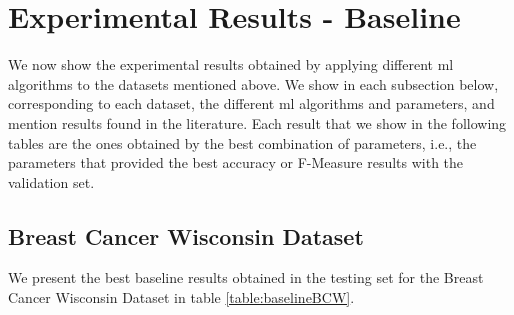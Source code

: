 \section{Experimental Results - Baseline}
\label{sec:ExperimentalResultsBaseline}


We now show the experimental results obtained by applying different \ac{ml} algorithms to the datasets mentioned above. We show in each subsection below, corresponding to each dataset, the different \ac{ml} algorithms and parameters, and mention results found in the literature. Each result that we show in the following tables are the ones obtained by the best combination of parameters, i.e., the parameters that provided the best accuracy or F-Measure results with the validation set.

\subsection{Breast Cancer Wisconsin Dataset}

We present the best baseline results obtained in the testing set for the Breast Cancer Wisconsin Dataset in table \ref{table:baselineBCW}.

